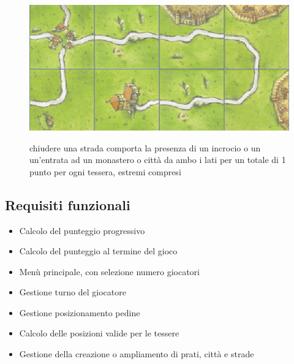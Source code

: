 \begin{figure}[]
    {\includegraphics[]{images/Strada.png}}

    \caption{chiudere una strada comporta la presenza di un incrocio o un un’entrata ad un monastero o città da ambo i lati per un totale di 1 punto per ogni tessera, estremi compresi}
\end{figure}

\subsection{Requisiti funzionali}
\begin{itemize}
\item Calcolo del punteggio progressivo
\end{itemize}
\begin{itemize}
\item Calcolo del punteggio al termine del gioco
\end{itemize}
\begin{itemize}
\item Menù principale, con selezione numero giocatori
\end{itemize}
\begin{itemize}
\item Gestione turno del giocatore
\end{itemize}
\begin{itemize}
\item Gestione posizionamento pedine
\end{itemize}
\begin{itemize}
\item Calcolo delle posizioni valide per le tessere
\end{itemize}
\begin{itemize}
\item Gestione della creazione o ampliamento di prati, città e strade
\end{itemize}

